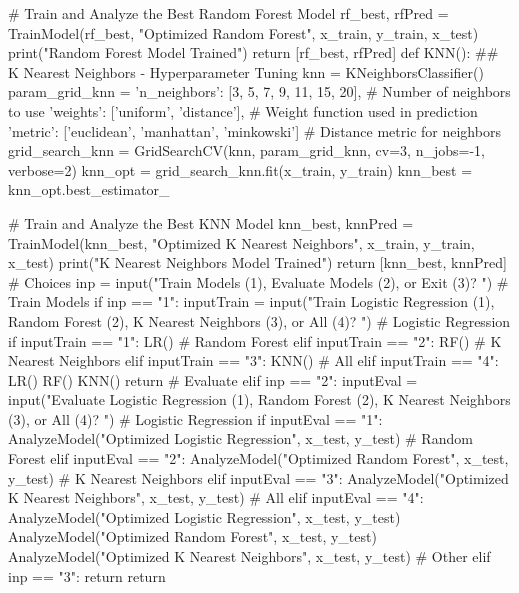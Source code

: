 {\begin{highlight}[Assets]
\begin{code}[Python]
            # Train and Analyze the Best Random Forest Model
            rf_best, rfPred = TrainModel(rf_best, "Optimized Random Forest", x_train, y_train, x_test)
            print("Random Forest Model Trained")
            return [rf_best, rfPred]
        def KNN():
            ## K Nearest Neighbors - Hyperparameter Tuning
            knn = KNeighborsClassifier()
            param_grid_knn = {
                'n_neighbors': [3, 5, 7, 9, 11, 15, 20],       # Number of neighbors to use
                'weights': ['uniform', 'distance'],            # Weight function used in prediction
                'metric': ['euclidean', 'manhattan', 'minkowski']  # Distance metric for neighbors
            }
            grid_search_knn = GridSearchCV(knn, param_grid_knn, cv=3, n_jobs=-1, verbose=2)
            knn_opt = grid_search_knn.fit(x_train, y_train)
            knn_best = knn_opt.best_estimator_

            # Train and Analyze the Best KNN Model
            knn_best, knnPred = TrainModel(knn_best, "Optimized K Nearest Neighbors", x_train, y_train, x_test)
            print("K Nearest Neighbors Model Trained")
            return [knn_best, knnPred]
        # Choices
        inp = input("Train Models (1), Evaluate Models (2), or Exit (3)? ")
        # Train Models
        if inp == "1":
            inputTrain = input("Train Logistic Regression (1), Random Forest (2), K Nearest Neighbors (3), or All (4)? ")
            # Logistic Regression
            if inputTrain == "1":
                LR()
            # Random Forest
            elif inputTrain == "2":
                RF()
            # K Nearest Neighbors
            elif inputTrain == "3":
                KNN()
            # All
            elif inputTrain == "4":
                LR()
                RF()
                KNN()
            return
        # Evaluate
        elif inp == "2":
            inputEval = input("Evaluate Logistic Regression (1), Random Forest (2), K Nearest Neighbors (3), or All (4)? ")
            # Logistic Regression
            if inputEval == "1":
                AnalyzeModel("Optimized Logistic Regression", x_test, y_test)
            # Random Forest
            elif inputEval == "2":
                AnalyzeModel("Optimized Random Forest", x_test, y_test)
            # K Nearest Neighbors
            elif inputEval == "3":
                AnalyzeModel("Optimized K Nearest Neighbors", x_test, y_test)
            # All
            elif inputEval == "4":
                AnalyzeModel("Optimized Logistic Regression", x_test, y_test)
                AnalyzeModel("Optimized Random Forest", x_test, y_test)
                AnalyzeModel("Optimized K Nearest Neighbors", x_test, y_test)
        # Other
        elif inp == "3":
            return
        return
    \end{code}
    \end{highlight}

}
